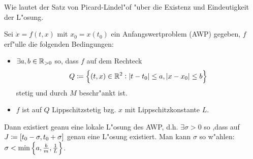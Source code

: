 \documentclass[9pt]{article}
\newcommand{\R}[1]{%
	\ifthenelse{\equal{#1}{}}
		{\mathbb{R}}
		{\mathbb{R}^#1}}%
\newenvironment{field}{}{\newpage}
\newif\ifnote
\newenvironment{note}{\notetrue}{\notefalse}
\newcommand{\localtag}{}
\newcommand{\globaltag}{}
\newcommand{\uuid}{}
\newcommand{\tags}[1]{
    \ifnote 
        \renewcommand{\localtag}{#1}
    \else
        \renewcommand{\globaltag}{#1}
    \fi 
    }
\newcommand{\xplain}[1]{\renewcommand{\uuid}{#1}}
\begin{document}
\begin{note}
	\xplain{UUID}
	\tags{satz, picard-lindeloef, 3.4.2}
	
	\begin{field}  %
		Wie lautet der Satz von Picard-Lindel"of "uber die Existenz und Eindeutigkeit der L"osung.
	\end{field}
	
	\begin{field}  %
		Sei $\dot{x} = f(t,x)$ mit $x_0= x(t_0)$ ein Anfangswertproblem (AWP) gegeben, $f$ erf"ulle die folgenden Bedingungen:
		\begin{itemize}
			\item $\exists a,b \in \R{}_{>0}$ so, dass $f$ auf dem Rechteck
			\begin{equation*}
				Q\coloneqq \qty{(t,x) \in \R{2}: \abs{t-t_0} \leq a, \abs{x-x_0} \leq b}
			\end{equation*}
			stetig und durch $M$ beschr"ankt ist. 
			\item $f$ ist auf $Q$ Lippschitzstetig bzg. $x$ mit Lippschitzkonstante $L$. 
		\end{itemize}
		Dann existiert geanu eine lokale L"osung des AWP, d.h. $\exists \sigma>0$ so ,dass auf
			$J\coloneqq \qty[t_0 - \sigma, t_0 + \sigma]$  genau eine L"osung existiert. Man kann $\sigma$ so w"ahlen: $\sigma < \min\qty{a, \frac{b}{m}, \frac{1}{L}}$.
	\end{field}
\end{note}
\end{document}

